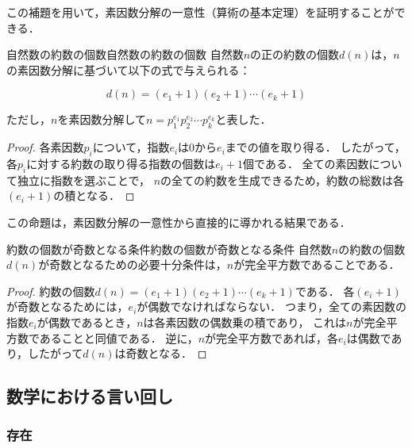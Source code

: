 \documentclass[a4paper,11pt]{ltjsarticle}
\newenvironment{tleftbar}{\begin{tbleftline}\setlength{\parindent}{1\zw}}{\end{tbleftline}}
\begin{document}
この補題を用いて，素因数分解の一意性（算術の基本定理）を証明することができる．

\begin{example}{自然数の約数の個数}{自然数の約数の個数}
自然数$n$の正の約数の個数$d(n)$は，$n$の素因数分解に基づいて以下の式で与えられる：

\begin{equation}
d(n) = (e_1 + 1)(e_2 + 1) \dotsm (e_k + 1)
\end{equation}

ただし，$n$を素因数分解して$n = p_1^{e_1} p_2^{e_2} \dotsm p_k^{e_k}$と表した．
\end{example}

\begin{tleftbar}
\begin{proof}
各素因数$p_i$について，指数$e_i$は$0$から$e_i$までの値を取り得る．
したがって，各$p_i$に対する約数の取り得る指数の個数は$e_i + 1$個である．
全ての素因数について独立に指数を選ぶことで，
$n$の全ての約数を生成できるため，約数の総数は各$(e_i + 1)$の積となる．
\end{proof}
\end{tleftbar}

この命題は，素因数分解の一意性から直接的に導かれる結果である．

\begin{example}{約数の個数が奇数となる条件}{約数の個数が奇数となる条件}
自然数$n$の約数の個数$d(n)$が奇数となるための必要十分条件は，$n$が完全平方数であることである．
\end{example}

\begin{tleftbar}
\begin{proof}
約数の個数$d(n) = (e_1 + 1)(e_2 + 1) \dotsm (e_k + 1)$である．
各$(e_i + 1)$が奇数となるためには，$e_i$が偶数でなければならない．
つまり，全ての素因数の指数$e_i$が偶数であるとき，$n$は各素因数の偶数乗の積であり，
これは$n$が完全平方数であることと同値である．
逆に，$n$が完全平方数であれば，各$e_i$は偶数であり，したがって$d(n)$は奇数となる．
\end{proof}
\end{tleftbar}

\subsection{数学における言い回し}
\subsubsection{存在}
\end{document}

